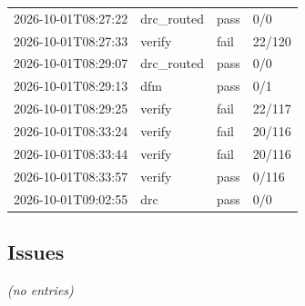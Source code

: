 \documentclass[11pt]{article}
\begin{document}
{\begin{longtable}{llll}
2026-10-01T08:27:22 & drc\_routed & pass & 0/0 \\
2026-10-01T08:27:33 & verify & fail & 22/120 \\
2026-10-01T08:29:07 & drc\_routed & pass & 0/0 \\
2026-10-01T08:29:13 & dfm & pass & 0/1 \\
2026-10-01T08:29:25 & verify & fail & 22/117 \\
2026-10-01T08:33:24 & verify & fail & 20/116 \\
2026-10-01T08:33:44 & verify & fail & 20/116 \\
2026-10-01T08:33:57 & verify & pass & 0/116 \\
2026-10-01T09:02:55 & drc & pass & 0/0 \\
\hline
\end{longtable}
}
\subsection*{Issues}
\emph{(no entries)}
\end{document}
